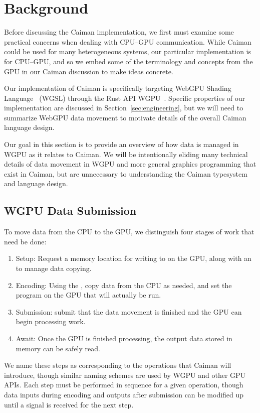 \section{Background}
\label{sec:background}

Before discussing the Caiman implementation, we first must examine some practical concerns when dealing with CPU--GPU communication.  While Caiman could be used for many heterogeneous systems, our particular implementation is for CPU--GPU, and so we embed some of the terminology and concepts from the GPU in our Caiman discussion to make ideas concrete.

Our implementation of Caiman is specifically targeting WebGPU Shading Language~\cite{webgsl} (WGSL) through the Rust API WGPU~\cite{wgpu}.  Specific properties of our implementation are discussed in Section~\ref{sec:engineering}, but we will need to summarize WebGPU data movement to motivate details of the overall Caiman language design.

Our goal in this section is to provide an overview of how data is managed in WGPU as it relates to Caiman.  We will be intentionally eliding many technical details of data movement in WGPU and more general graphics programming that exist in Caiman, but are unnecessary to understanding the Caiman typesystem and language design.

\subsection{WGPU Data Submission}
\label{subsec:promise}

To move data from the CPU to the GPU, we distinguish four stages of work that need be done:

\begin{enumerate}
\item Setup: Request a memory location for writing to on the GPU, along with an  to manage data copying.
\item Encoding: Using the , copy data from the CPU as needed, and set the program on the GPU that will actually be run.
\item Submission: submit that the data movement is finished and the GPU can begin processing work.
\item Await: Once the GPU is finished processing, the output data stored in memory can be safely read.
\end{enumerate}

We name these steps as corresponding to the operations that Caiman will introduce, though similar naming schemes are used by WGPU and other GPU APIs.  Each step must be performed in sequence for a given operation, though data inputs during encoding and outputs after submission can be modified up until a signal is received for the next step.

